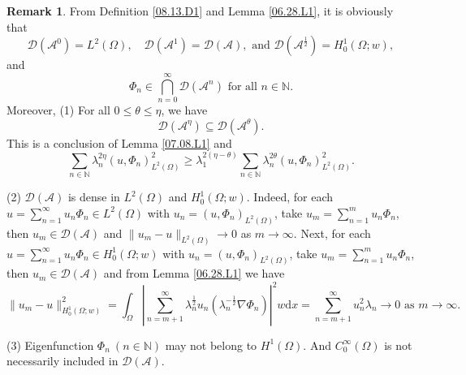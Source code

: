 \documentclass[preprint,12pt]{elsarticle}
\theoremstyle{definition}   %
\newtheorem{remark}[theorem]{Remark}
\numberwithin{equation}{section}
\def\ra{\rightarrow}
\def\s{\subseteq}
\def\ba{\bigcap}
\def\Om{\Omega}
\def\la{\lambda}
\def\iy{\infty}
\def\f{\frac}
\def\df{\mathrm d}
\def\mcA{\mathcal{A}}
\def\mcD{\mathcal{D}}
\newcommand{\N}{\mathbb N}
\begin{document}
\begin{remark}\label{08.13.R1}
	From Definition \ref{08.13.D1} and Lemma \ref{06.28.L1}, it is obviously that 
	\begin{equation*}
		\mcD(\mcA^0)=L^2(\Om),\quad \mcD(\mcA^1)=\mcD(\mcA), \mbox{ and } \mcD(\mcA^\f{1}{2})=H_0^1(\Om;w), 
	\end{equation*}
	and 
	\begin{equation*}
		\Phi_n\in \ba_{n=0}^\iy \mcD(\mcA^n) \mbox{ for all } n\in\N. 
	\end{equation*}
	Moreover, (1) For all $0\leq \theta\leq \eta$, we have
	\begin{equation*}
		\mcD(\mcA^\eta)\s \mcD(\mcA^\theta).
	\end{equation*}
	This is a conclusion of Lemma \ref{07.08.L1} and 
	\begin{equation*}
		\sum_{n\in\N}\la_n^{2\eta}(u,\Phi_n)_{L^2(\Om)}^2\geq \la_1^{2(\eta-\theta)}\sum_{n\in\N}\la_n^{2\theta}(u,\Phi_n)_{L^2(\Om)}^2. 
	\end{equation*}
	
	(2) $\mcD(\mcA)$ is dense in $L^2(\Om)$ and $H_0^1(\Om;w)$. Indeed, for each $u=\sum_{n=1}^\iy u_n\Phi_n\in L^2(\Om)$ with $u_n=(u, \Phi_n)_{L^2(\Om)}$, take $u_m=\sum_{n=1}^m u_n\Phi_n$, then $u_m\in \mcD(\mcA)$ and $\|u_m-u\|_{L^2(\Om)}\ra 0$ as $m\ra\iy$. Next, for each $u=\sum_{n=1}^\iy u_n\Phi_n\in H_0^1(\Om;w)$ with $u_n=(u,\Phi_n)_{L^2(\Om)}$,  take $u_m=\sum_{n=1}^m u_n\Phi_n$, then $u_m\in\mcD(\mcA)$ and from Lemma \ref{06.28.L1} we have 
	\begin{equation*}
		\|u_m-u\|_{H_0^1(\Om;w)}^2=\int_\Om \left|\sum_{n=m+1}^\iy \la_n^\f{1}{2}u_n \left(\la_n^{-\f{1}{2}}\nabla \Phi_n\right)\right|^2w\df x=\sum_{n=m+1}^\iy u_n^2\la_n \ra 0 \mbox{ as } m\ra\iy. 
	\end{equation*}
	
	(3) Eigenfunction $\Phi_n\ (n\in\N)$ may not belong to $H^1(\Om)$. And $C_0^\iy(\Om)$ is not necessarily included in  $\mcD(\mcA)$. 
\end{remark}
\end{document}
